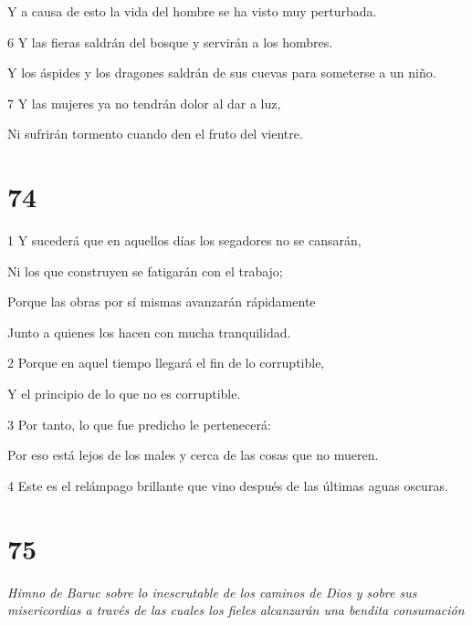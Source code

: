 \par Y a causa de esto la vida del hombre se ha visto muy perturbada.

\par 6 Y las fieras saldrán del bosque y servirán a los hombres.

\par Y los áspides y los dragones saldrán de sus cuevas para someterse a un niño.

\par 7 Y las mujeres ya no tendrán dolor al dar a luz,

\par Ni sufrirán tormento cuando den el fruto del vientre.

\chapter{74}

\par 1 Y sucederá que en aquellos días los segadores no se cansarán,

\par Ni los que construyen se fatigarán con el trabajo;

\par Porque las obras por sí mismas avanzarán rápidamente

\par Junto a quienes los hacen con mucha tranquilidad.

\par 2 Porque en aquel tiempo llegará el fin de lo corruptible,

\par Y el principio de lo que no es corruptible.

\par 3 Por tanto, lo que fue predicho le pertenecerá:

\par Por eso está lejos de los males y cerca de las cosas que no mueren.

\par 4 Este es el relámpago brillante que vino después de las últimas aguas oscuras.

\chapter{75}

\par \textit{Himno de Baruc sobre lo inescrutable de los caminos de Dios y sobre sus misericordias a través de las cuales los fieles alcanzarán una bendita consumación}


